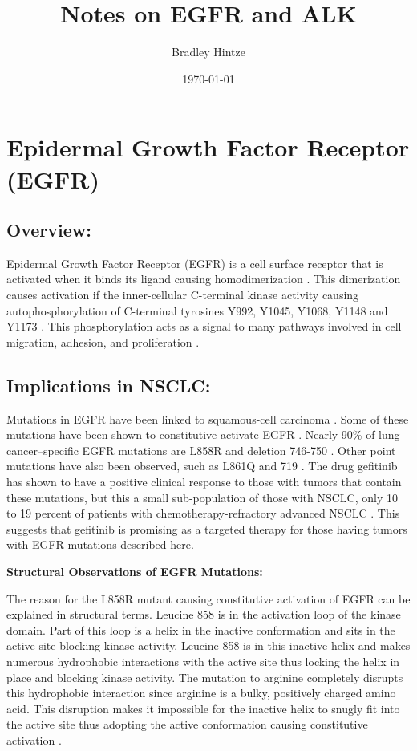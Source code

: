 \documentclass[12pt]{article}
\title{Notes on EGFR and ALK}
\author{Bradley Hintze}
\date{\today}
\begin{document}
\maketitle

\section{Epidermal Growth Factor Receptor (EGFR)}
\subsection*{Overview:}
Epidermal Growth Factor Receptor (EGFR) is a cell surface receptor that is activated when it binds its ligand causing homodimerization \cite{Yarden1987}. This dimerization causes activation if the inner-cellular C-terminal kinase activity causing autophosphorylation of C-terminal tyrosines Y992, Y1045, Y1068, Y1148 and Y1173 \cite{Downward1984}. This phosphorylation acts as a signal to many pathways involved in cell migration, adhesion, and proliferation \cite{Oda2005}.

\subsection*{Implications in NSCLC:}
Mutations in EGFR have been linked to squamous-cell carcinoma \cite{Walker2009}. Some of these mutations have been shown to constitutive activate EGFR \cite{Lynch2004}. Nearly 90\% of lung-cancer--specific EGFR mutations are L858R and deletion 746-750 \cite{Rosell2009}. Other point mutations have also been observed, such as L861Q \cite{Lynch2004} and 719 \cite{Kosaka2004}. The drug gefitinib has shown to have a positive clinical response to those with tumors that contain these mutations, but this a small sub-population of those with NSCLC, only 10 to 19 percent of patients with chemotherapy-refractory advanced NSCLC \cite{Kris2003,Fukuoka2003}. This suggests that gefitinib is promising as a targeted therapy for those having tumors with EGFR mutations described here.

\vspace{5px}
\noindent
\textbf{Structural Observations of EGFR Mutations:}

\noindent
The reason for the L858R mutant causing constitutive activation of EGFR can be explained in structural terms. Leucine 858 is in the activation loop of the kinase domain. Part of this loop is a helix in the inactive conformation and sits in the active site blocking kinase activity. Leucine 858 is in this inactive helix and makes numerous hydrophobic interactions with the active site thus locking the helix in place and blocking kinase activity. The mutation to arginine completely disrupts this hydrophobic interaction since arginine is a bulky, positively charged amino acid. This disruption makes it impossible for the inactive helix to snugly fit into the active site thus adopting the active conformation causing constitutive activation \cite{Zhang2006}.
\end{document}
